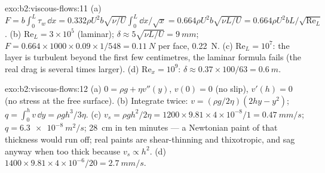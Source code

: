 \begin{solution}{exo:b2:viscous-flows:11}
(a) $F = b\int_0^L\tau_w\,\dd x = 0.332\rho U^2b\sqrt{\nu/U}\int_0^L\dd x/\sqrt x =
0.664\rho U^2b\sqrt{\nu L/U} = 0.664\rho U^2bL/\sqrt{\mathrm{Re}_L}$. (b) $\mathrm{Re}_L =
3 \times 10^5$ (laminar); $\delta \approx 5\sqrt{\nu L/U} = \qty{9}{mm}$; $F = 0.664 \times 1000
\times 0.09 \times 1/548 = \qty{0.11}{N}$ per face, \qty{0.22}{N}. (c) $\mathrm{Re}_L = 10^7$:
the layer is turbulent beyond the first few centimetres, the laminar
formula fails (the real drag is several times larger). (d) $\mathrm{Re}_x =
10^9$: $\delta \approx 0.37 \times 100/63 = \qty{0.6}{m}$.
\end{solution}

\begin{solution}{exo:b2:viscous-flows:12}
(a) $0 = \rho g + \eta v''(y)$, $v(0) = 0$ (no slip), $v'(h) = 0$ (no stress at
the free surface). (b) Integrate twice: $v = (\rho g/2\eta)(2hy - y^2)$; $q =
\int_0^hv\,\dd y = \rho gh^3/3\eta$. (c) $v_s = \rho gh^2/2\eta = 1200 \times 9.81 \times
4 \times 10^{-8}/1 = \qty{0.47}{mm/s}$; $q = \qty{6.3e-8}{m^2/s}$; \qty{28}{cm} in ten
minutes --- a Newtonian paint of that thickness would run off; real
paints are shear-thinning and thixotropic, and sag anyway when too thick
because $v_s \propto h^2$. (d) $1400 \times 9.81 \times 4 \times 10^{-6}/20 = \qty{2.7}{mm/s}$.
\end{solution}

